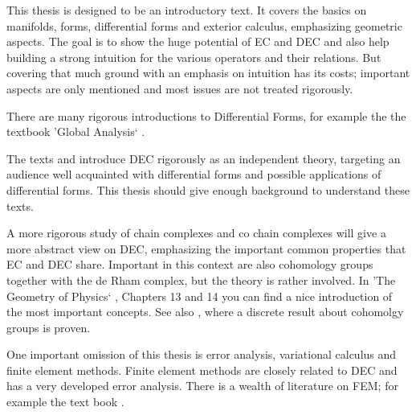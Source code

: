This thesis is designed to be an introductory text. It covers the  basics on manifolds, forms, differential forms and exterior calculus, emphasizing geometric aspects. The goal is to show the huge potential of EC and DEC and also help building a strong intuition for the various operators and their relations. But covering that much ground with an emphasis on intuition has its costs; important aspects are only mentioned and most issues are not treated rigorously.


There are many rigorous introductions to Differential Forms, for example the the textbook 'Global Analysis` \cite{globalAnalysis}. 

The texts \cite{hirani03} and \cite{DECdesbrunEtAl} introduce DEC rigorously as an independent theory, targeting an audience well acquainted with differential forms and possible applications of differential forms. This thesis should give enough background to understand these texts. 

A more rigorous study of chain complexes and co chain complexes will give a more abstract view on DEC, emphasizing the important common properties that EC and DEC share. Important in this context are also cohomology groups together with the de Rham complex, but the theory is rather involved. In 'The Geometry of Physics` \cite{FRANKEL11}, Chapters 13 and 14 you can find a nice introduction of the most important concepts. See also \cite{DMK08}, where a discrete result about cohomolgy groups is proven. 

One important omission of this thesis is error analysis, variational calculus and finite element methods. Finite element methods are closely related to DEC and has a very developed error analysis. There is a wealth of literature on FEM; for example the text book \cite{citeulike:4388136}.